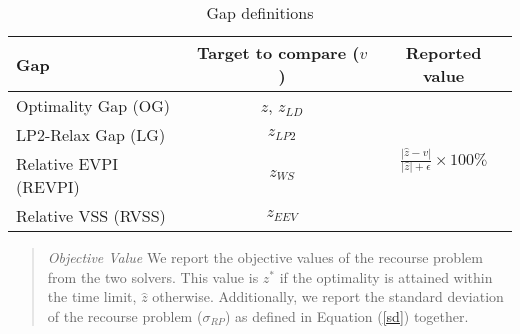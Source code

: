 

\begin{table}[H]
	\centering
	\caption{Gap definitions}
	\label{table:gap}
	\begin{tabular}{lcc}
		\hline
		Gap   & Target to compare ($v$) & Reported value                                                        \\ \hline
		Optimality Gap (OG)   & $z$, $z_{LD}$    & \multirow{4}{*}{$\frac{|\hat{z}-v|}{|\hat{z}|+\epsilon}\times 100\%$} \\
		LP2-Relax Gap (LG)   & $z_{LP2}$    &                                                                       \\
		Relative EVPI (REVPI) & $z_{WS}$     &                                                                       \\
		Relative VSS (RVSS)  & $z_{EEV}$    &                                                                       \\ \hline
	\end{tabular}
\end{table}

\begin{quote}
	\noindent\textit{Objective Value} We report the objective values of the recourse problem from the two solvers. This value is $z^*$ if the optimality is attained within the time limit, $\hat{z}$ otherwise. Additionally, we report the standard deviation of the recourse problem ($\sigma_{RP}$) as defined in Equation (\ref{sd}) together.
\end{quote}

